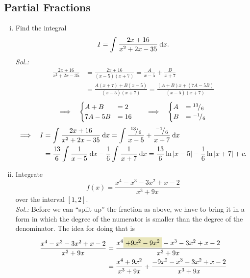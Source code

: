 \subsection{Partial Fractions}

\begin{example}
\label{expl:partial_fractions}
\begin{enumerate}[(i)]
	\item Find the integral
	\[ I = \int_{}^{} \frac{2x+16}{x^2+2x-35} \: \mathrm{d} x. \]
	{\it Sol.:}
	\begin{equation*}
	\begin{split}
	\frac{2x+16}{x^2+2x-35} & =\frac{2x+16}{(x-5)(x+7)}
	= \frac{A}{x-5} +\frac{B}{x+7} \\
	& = \frac{A(x+7)+B(x-5)}{(x-5)(x+7)}
	= \frac{(A+B)x+(7A-5B)}{(x-5)(x+7)}
	\end{split}
	\end{equation*}
	\[ \Longrightarrow \quad \begin{cases} A+B &= 2 \\ 7A-5B &= 16 \end{cases} 
		\qquad \Longrightarrow \quad 
		\begin{cases} A &= {}^{13}\!/_{6} \\ B &= {}^{-1}\!/_{6} \end{cases} \]
	\begin{equation*}
		\begin{split}
			\Longrightarrow \quad I & = \int_{}^{} \frac{2x+16}{x^2+2x-35} \: \mathrm{d} x
			= \int_{}^{}  \frac{{}^{13}\!/_{6}}{x-5} +\frac{{}^{-1}\!/_{6}}{x+7}  \: \mathrm{d} x \\
			& = \frac{13}{6} \int_{}^{} \frac{1}{x-5} \: \mathrm{d} x 
				- \frac{1}{6} \int_{}^{} \frac{1}{x+7} \: \mathrm{d} x
			= \frac{13}{6} \ln\left| x-5 \right|	- \frac{1}{6} \ln\left| x+7 \right| + c.
		\end{split}
	\end{equation*}
	\item Integrate
	\[ f(x) = \frac{x^4-x^3-3x^2+x-2}{x^3+9x} \]
	over the interval $[1,2]$. \\
	{\it Sol.:}
	Before we can ``split up'' the fraction as above, we have to bring it in a form in which the degree of the numerator is smaller than the degree of the denominator. The idea for doing that is
	\begin{equation*}
	\begin{split}
	\frac{x^4-x^3-3x^2+x-2}{x^3+9x} & = \frac{x^4\colorbox{olive!20}{+$9x^2-9x^2$}-x^3-3x^2+x-2}{x^3+9x} \\
	& = \frac{x^4+9x^2}{x^3+9x} + \frac{-9x^2-x^3-3x^2+x-2}{x^3+9x} \\

\end{split}
\end{equation*}
\end{enumerate}
\end{example}
